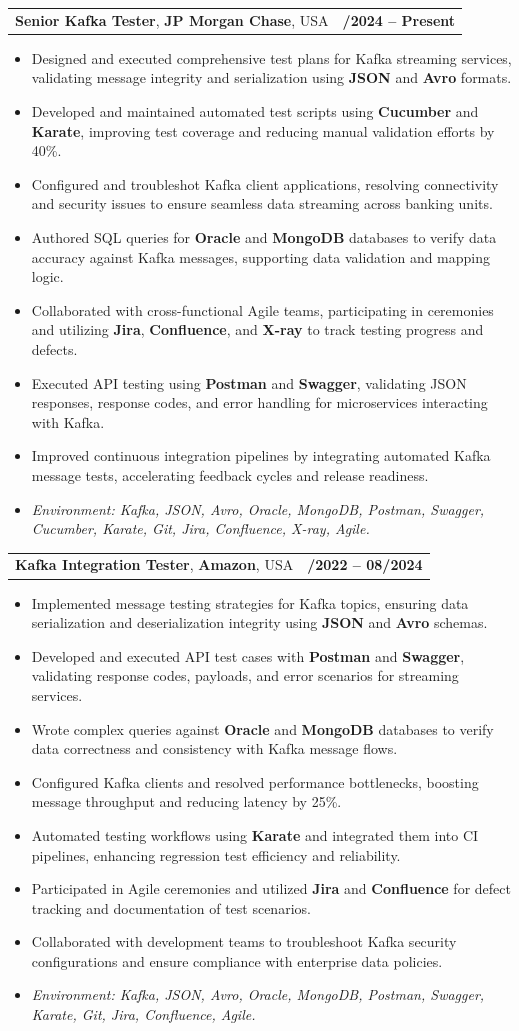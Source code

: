 \documentclass[letterpaper,11pt]{article}
\makeatletter
\newcommand{\resumeItem}[1]{
  \item\footnotesize{
    {#1 \vspace{-2pt}}
  }
}
\newcommand{\resumeSubheading}[4]{
  \vspace{-2pt}\item
    \begin{tabular*}{1.0\textwidth}[t]{l@{\extracolsep{\fill}}r}
      \textbf{\fontsize{10pt}{14pt}\selectfont #3}, \textbf{\fontsize{10pt}{14pt}\selectfont #1}, \fontsize{10pt}{14pt}\selectfont #4 & \textbf{\fontsize{10pt}{14pt}\selectfont #2} \\
    \end{tabular*}\vspace{-7pt}
}
\newcommand{\resumeItemListStart}{\begin{itemize}[leftmargin=*]}
\newcommand{\resumeItemListEnd}{\end{itemize}\vspace{-5pt}}
\makeatother
\begin{document}
\resumeSubheading
{JP Morgan Chase}{09/2024 -- Present}
{Senior Kafka Tester}{USA}
\resumeItemListStart
  \resumeItem{Designed and executed comprehensive test plans for Kafka streaming services, validating message integrity and serialization using \textbf{JSON} and \textbf{Avro} formats.}
  \resumeItem{Developed and maintained automated test scripts using \textbf{Cucumber} and \textbf{Karate}, improving test coverage and reducing manual validation efforts by 40\%.}
  \resumeItem{Configured and troubleshot Kafka client applications, resolving connectivity and security issues to ensure seamless data streaming across banking units.}
  \resumeItem{Authored SQL queries for \textbf{Oracle} and \textbf{MongoDB} databases to verify data accuracy against Kafka messages, supporting data validation and mapping logic.}
  \resumeItem{Collaborated with cross-functional Agile teams, participating in ceremonies and utilizing \textbf{Jira}, \textbf{Confluence}, and \textbf{X-ray} to track testing progress and defects.}
  \resumeItem{Executed API testing using \textbf{Postman} and \textbf{Swagger}, validating JSON responses, response codes, and error handling for microservices interacting with Kafka.}
  \resumeItem{Improved continuous integration pipelines by integrating automated Kafka message tests, accelerating feedback cycles and release readiness.}
  \resumeItem{\textit{Environment: Kafka, JSON, Avro, Oracle, MongoDB, Postman, Swagger, Cucumber, Karate, Git, Jira, Confluence, X-ray, Agile.}}
\resumeItemListEnd

\resumeSubheading
{Amazon}{10/2022 -- 08/2024}
{Kafka Integration Tester}{USA}
\resumeItemListStart
  \resumeItem{Implemented message testing strategies for Kafka topics, ensuring data serialization and deserialization integrity using \textbf{JSON} and \textbf{Avro} schemas.}
  \resumeItem{Developed and executed API test cases with \textbf{Postman} and \textbf{Swagger}, validating response codes, payloads, and error scenarios for streaming services.}
  \resumeItem{Wrote complex queries against \textbf{Oracle} and \textbf{MongoDB} databases to verify data correctness and consistency with Kafka message flows.}
  \resumeItem{Configured Kafka clients and resolved performance bottlenecks, boosting message throughput and reducing latency by 25\%.}
  \resumeItem{Automated testing workflows using \textbf{Karate} and integrated them into CI pipelines, enhancing regression test efficiency and reliability.}
  \resumeItem{Participated in Agile ceremonies and utilized \textbf{Jira} and \textbf{Confluence} for defect tracking and documentation of test scenarios.}
  \resumeItem{Collaborated with development teams to troubleshoot Kafka security configurations and ensure compliance with enterprise data policies.}
  \resumeItem{\textit{Environment: Kafka, JSON, Avro, Oracle, MongoDB, Postman, Swagger, Karate, Git, Jira, Confluence, Agile.}}
\resumeItemListEnd
\end{document}
